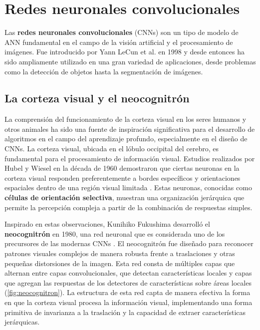 
\chapter{Redes neuronales convolucionales}
\label{chapter:cnn}

Las \textbf{redes neuronales convolucionales} (CNNs)
\cite{krizhevsky2012imagenet} son un tipo de modelo de ANN fundamental en el
campo de la visión artificial y el procesamiento de imágenes. Fue introducido por
Yann LeCun et al. en 1998 \cite{lecun1998gradient} y desde entonces ha sido
ampliamente utilizado en una gran variedad de aplicaciones, desde problemas como
la detección de objetos hasta la segmentación de imágenes.

\section{La corteza visual y el neocognitrón}

La comprensión del funcionamiento de la corteza visual en los seres humanos y
otros animales ha sido una fuente de inspiración significativa para el
desarrollo de algoritmos en el campo del aprendizaje profundo, especialmente en el
diseño de CNNs. La corteza visual, ubicada en el lóbulo occipital del cerebro,
es fundamental para el procesamiento de información visual. Estudios realizados por
Hubel y Wiesel en la década de 1960 demostraron que ciertas neuronas en la corteza
visual responden preferentemente a bordes específicos y orientaciones espaciales
dentro de una región visual limitada \cite{hubel1962receptive}. Estas neuronas, conocidas
como \textbf{células de orientación selectiva}, muestran una organización jerárquica
que permite la percepción compleja a partir de la combinación de respuestas simples.

Inspirado en estas observaciones, Kunihiko Fukushima desarrolló el \textbf{neocognitrón}
en 1980, una red neuronal que es considerada uno de los precursores de las
modernas CNNs \cite{fukushima1980neocognitron}. El neocognitrón fue diseñado para
reconocer patrones visuales complejos de manera robusta frente a traslaciones y otras
pequeñas distorsiones de la imagen. Esta red consta de múltiples capas que
alternan entre capas convolucionales, que detectan características locales y capas
que agregan las respuestas de los detectores de características sobre áreas locales
(\autoref{fig:neocognitron}). La estructura de esta red capta de manera efectiva
la forma en que la corteza visual procesa la información visual, implementando una
forma primitiva de invarianza a la traslación y la capacidad de extraer características
jerárquicas.

